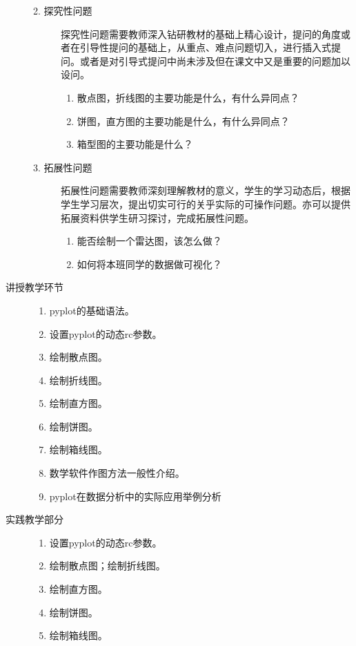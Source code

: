 \documentclass[12pt,a4paper,openany,cap]{ctexbook}
\begin{document}
\begin{description}
\begin{minipage}[t]{0.8\linewidth}
\begin{description}
\item[2. 探究性问题] 
探究性问题需要教师深入钻研教材的基础上精心设计，提问的角度或者在引导性提问的基础上，从重点、难点问题切入，进行插入式提问。或者是对引导式提问中尚未涉及但在课文中又是重要的问题加以设问。
\begin{enumerate}
\item 散点图，折线图的主要功能是什么，有什么异同点？
\item\label{item:92}  饼图，直方图的主要功能是什么，有什么异同点？
\item\label{item:93}  箱型图的主要功能是什么？
\end{enumerate}
 
\item[3. 拓展性问题] 
拓展性问题需要教师深刻理解教材的意义，学生的学习动态后，根据学生学习层次，提出切实可行的关乎实际的可操作问题。亦可以提供拓展资料供学生研习探讨，完成拓展性问题。
\begin{enumerate}
\item     能否绘制一个雷达图，该怎么做？
\item\label{item:94}  如何将本班同学的数据做可视化？
\end{enumerate}
    \end{description}
  \end{minipage}
  
\item[讲授教学环节]
  \begin{minipage}[t]{0.8\linewidth}
    \begin{enumerate}
    \item   pyplot的基础语法。
\item\label{item:95}  设置pyplot的动态rc参数。
\item\label{item:96}  绘制散点图。
\item\label{item:97}  绘制折线图。
\item\label{item:98}  绘制直方图。
\item\label{item:99}  绘制饼图。
\item\label{item:100}  绘制箱线图。
\item\label{item:18} 数学软件作图方法一般性介绍。
\item\label{item:19} pyplot在数据分析中的实际应用举例分析  
    \end{enumerate}
  \end{minipage}

\item[实践教学部分]
  \begin{minipage}[t]{0.8\linewidth}
    \begin{enumerate}
    \item  设置pyplot的动态rc参数。
\item\label{item:101}  绘制散点图；绘制折线图。
\item\label{item:102}  绘制直方图。
\item\label{item:103}  绘制饼图。
\item\label{item:104}  绘制箱线图。
    \end{enumerate}
  \end{minipage}

\end{description}
\end{document}
